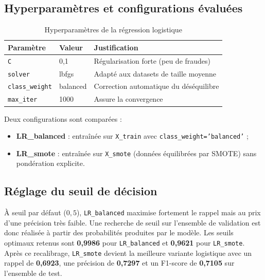 \subsection{Hyperparamètres et configurations évaluées}

\begin{table}[H]
\centering
\caption{Hyperparamètres de la régression logistique}
\label{tab:lr_params}
\begin{tabular}{lll}
\toprule
\textbf{Paramètre} & \textbf{Valeur} & \textbf{Justification} \\
\midrule
\texttt{C}             & 0,1      & Régularisation forte (peu de fraudes) \\
\texttt{solver}        & lbfgs   & Adapté aux datasets de taille moyenne \\
\texttt{class\_weight} & balanced & Correction automatique du déséquilibre \\
\texttt{max\_iter}     & 1000    & Assure la convergence \\
\bottomrule
\end{tabular}
\end{table}

Deux configurations sont comparées :
\begin{itemize}
  \item \textbf{LR\_balanced} : entraînée sur \texttt{X\_train} avec
    \texttt{class\_weight='balanced'} ;
  \item \textbf{LR\_smote} : entraînée sur \texttt{X\_smote} (données équilibrées par
    SMOTE) sans pondération explicite.
\end{itemize}

\subsection{Réglage du seuil de décision}

À seuil par défaut ($0{,}5$), \texttt{LR\_balanced} maximise fortement le rappel mais au
prix d'une précision très faible. Une recherche de seuil sur l'ensemble de validation est
donc réalisée à partir des probabilités produites par le modèle. Les seuils optimaux retenus
sont \textbf{0,9986} pour \texttt{LR\_balanced} et \textbf{0,9621} pour \texttt{LR\_smote}.
Après ce recalibrage, \texttt{LR\_smote} devient la meilleure variante logistique avec un
rappel de \textbf{0,6923}, une précision de \textbf{0,7297} et un F1-score de
\textbf{0,7105} sur l'ensemble de test.

